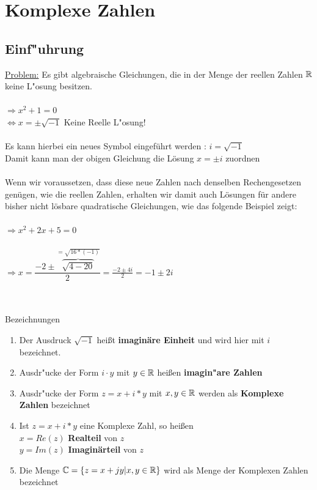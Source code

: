 \chapter{Komplexe Zahlen}



	\section{Einf"uhrung}
\underline{Problem:} Es gibt algebraische Gleichungen, die in der Menge  der reellen Zahlen $\mathbb{R}$  keine L"osung besitzen.\\
\\
$\Rightarrow x^2 + 1 = 0   $\\
$\Leftrightarrow x = ± \sqrt{-1}$ Keine Reelle L"osung!\\
\\
Es kann hierbei ein neues Symbol eingeführt werden : $i = \sqrt{-1} $\\
Damit kann man der obigen Gleichung die Lösung $x =±i$ zuordnen\\
\\
Wenn wir voraussetzen, dass diese neue Zahlen nach denselben Rechengesetzen genügen, wie die reellen Zahlen, erhalten wir damit auch Lösungen für andere bisher nicht lösbare quadratische Gleichungen, wie das folgende Beispiel zeigt:\\
\\
$\Rightarrow x^2 + 2x + 5 = 0$\\
\\
$\Rightarrow x = \dfrac { -2± \overbrace{ \sqrt{4-20}}^{=\sqrt{16*(-1)}} } { 2}
=\frac {-2 ±4i}{2}
= -1±2i$\\
\\
\\
\begin{Bemerkung}
Bezeichnungen\\
\end{Bemerkung}

\begin{enumerate}
\item Der Ausdruck $\sqrt{-1}$ heißt \textbf{imaginäre Einheit} und wird hier mit $i$ bezeichnet.
\item Ausdr"ucke der Form $i\cdot y$ mit $y \in \mathbb{R}$  heißen \textbf{imagin"are Zahlen}
\item Ausdr"ucke der Form $z =x+i*y$ mit $x,y \in \mathbb{R}$ werden als \textbf{Komplexe Zahlen} bezeichnet
\item Ist $z =x+i*y$ eine Komplexe Zahl, so heißen\\
\indent $x=Re(z)$ \textbf{Realteil} von $z$\\
\indent $y=Im(z)$ \textbf{Imaginärteil} von $z$
\item Die Menge $\mathbb{C} =\{ {z = x+j y| x, y \in \mathbb{R}}\}$ wird als Menge der Komplexen Zahlen bezeichnet\\
\end{enumerate}

